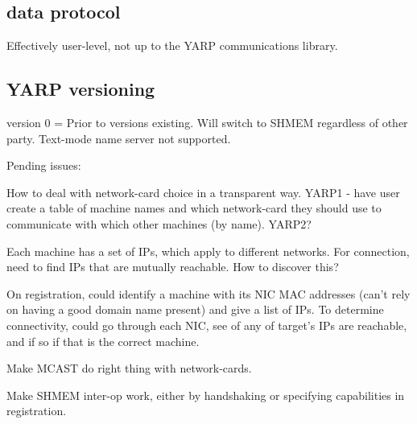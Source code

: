 \subsection{data protocol}

Effectively user-level, not up to the YARP communications library.


\subsection{YARP versioning}


version 0 = Prior to versions existing.
Will switch to SHMEM regardless of other party.
Text-mode name server not supported.

Pending issues: 

How to deal with network-card choice in a transparent
way.  YARP1 - have user create a table of machine names and which
network-card they should use to communicate with which other machines
(by name).  YARP2?  

Each machine has a set of IPs, which apply to different networks.
For connection, need to find IPs that are mutually reachable.
How to discover this?

On registration, could identify a machine with its NIC 
MAC addresses (can't rely on having a good domain name present)
and give a list of IPs.  To determine connectivity, could go
through each NIC, see of any of target's IPs are reachable,
and if so if that is the correct machine.


Make MCAST do right thing with network-cards.

Make SHMEM inter-op work, either by handshaking or specifying 
capabilities in registration.

